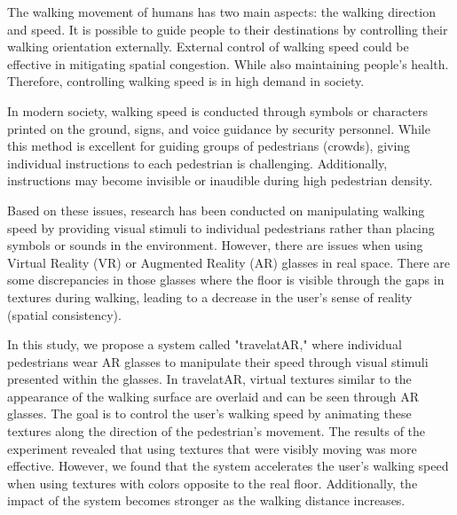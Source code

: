 The walking movement of humans has two main aspects: the walking direction and speed. It is possible to guide people to their destinations by controlling their walking orientation externally. External control of walking speed could be effective in mitigating spatial congestion. While also maintaining people's health. Therefore, controlling walking speed is in high demand in society.


In modern society, walking speed is conducted through symbols or characters printed on the ground, signs, and voice guidance by security personnel. While this method is excellent for guiding groups of pedestrians (crowds), giving individual instructions to each pedestrian is challenging. Additionally, instructions may become invisible or inaudible during high pedestrian density.


Based on these issues, research has been conducted on manipulating walking speed by providing visual stimuli to individual pedestrians rather than placing symbols or sounds in the environment. However, there are issues when using Virtual Reality (VR) or Augmented Reality (AR) glasses in real space. There are some discrepancies in those glasses where the floor is visible through the gaps in textures during walking, leading to a decrease in the user's sense of reality (spatial consistency).


In this study, we propose a system called "travelatAR," where individual pedestrians wear AR glasses to manipulate their speed through visual stimuli presented within the glasses. In travelatAR, virtual textures similar to the appearance of the walking surface are overlaid and can be seen through AR glasses. The goal is to control the user's walking speed by animating these textures along the direction of the pedestrian's movement. The results of the experiment revealed that using textures that were visibly moving was more effective. However, we found that the system accelerates the user's walking speed when using textures with colors opposite to the real floor. Additionally, the impact of the system becomes stronger as the walking distance increases.

